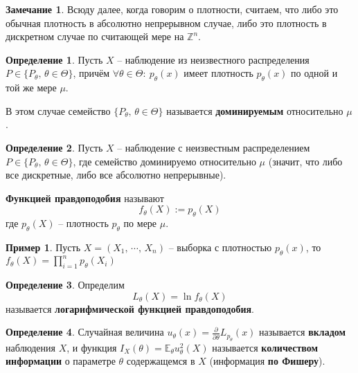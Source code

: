 \documentclass[a4paper,12pt]{article}
\theoremstyle{plain}
\theoremstyle{definition}
\newtheorem{definition}{Определение}[section]
\newtheorem*{note}{Замечание}
\newtheorem*{example}{Пример}
\theoremstyle{remark}
\begin{document}
\begin{note}
  Всюду далее, когда говорим о плотности, считаем, что либо это обычная плотность в абсолютно непрерывном случае, либо это плотность в дискретном случае по считающей мере на $\mathbb{Z}^n$.
\end{note}

\begin{definition}
  Пусть $X$ -- наблюдение из неизвестного распределения $P \in \{P_\theta,\, \theta \in \Theta\}$, причём $\forall \theta \in \Theta :\: p_\theta(x)$ имеет плотность $p_\theta(x)$ по одной и той же мере $\mu$.

  В этом случае семейство $\{P_\theta,\, \theta \in \Theta\}$ называется \textbf{доминируемым} относительно $\mu$.
\end{definition}

\begin{definition}
  Пусть $X$ -- наблюдение с неизвестным распределением $P \in \{P_\theta,\, \theta \in \Theta\}$, где семейство доминируемо относительно $\mu$ (значит, что либо все дискретные, либо все абсолютно непрерывные).

  \textbf{Функцией правдоподобия} называют
  \[
    f_\theta(X) := p_\theta(X)
  \]
  где $p_\theta(X)$ -- плотность $p_\theta$ по мере $\mu$.
\end{definition}

\begin{example}
  Пусть $X = (X_1,\,\cdots,\,X_n)$ -- выборка с плотностью $p_\theta(x)$, то $f_\theta(X) = \prod_{i = 1}^n p_\theta(X_i)$
\end{example}

\begin{definition}
  Определим
  \[
    L_\theta(X) = \ln f_\theta(X)
  \]
  называется \textbf{логарифмической функцией правдоподобия}.
\end{definition}

\begin{definition}
  Случайная величина $u_\theta(x) = \frac{\partial}{\partial \theta}L_{p_\theta}(x)$ называется \textbf{вкладом} наблюдения $X$, и функция $I_X(\theta) = \mathbb{E}_\theta u_\theta^2(X)$ называется \textbf{количеством информации} о параметре $\theta$ содержащемся в $X$ (информация \textbf{по Фишеру}).
\end{definition}
\end{document}
